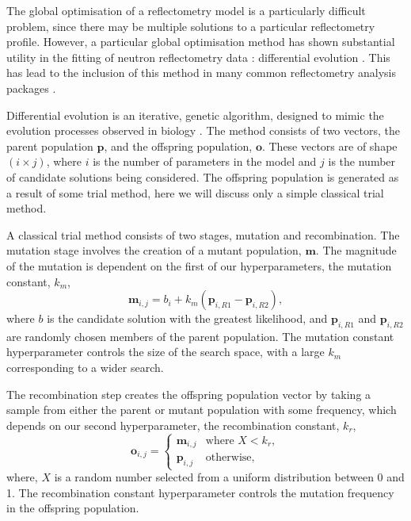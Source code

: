 \documentclass[
 reprint,
 superscriptaddress,
 amsmath,amssymb,
 aps,
]{revtex4-1}
\begin{document}
The global optimisation of a reflectometry model is a particularly difficult problem, since there may be multiple solutions to a particular reflectometry profile.
However, a particular global optimisation method has shown substantial utility in the fitting of neutron reflectometry data \cite{varderlee_comparison_2007}: differential evolution \cite{StornPrice_1997_DE,wormington_characterization_1999}.
This has lead to the inclusion of this method in many common reflectometry analysis packages \cite{bjorck_fitting_2011,nelson_refnx_2019,kienzle_ncnr_nodate}.

Differential evolution is an iterative, genetic algorithm, designed to mimic the evolution processes observed in biology \cite{holland_adaptation_1992}.
The method consists of two vectors, the parent population $\mathbf{p}$, and the offspring population, $\mathbf{o}$.
These vectors are of shape $(i \times j)$, where $i$ is the number of parameters in the model and $j$ is the number of candidate solutions being considered.
The offspring population is generated as a result of some trial method, here we will discuss only a simple classical trial method.

A classical trial method consists of two stages, mutation and recombination.
The mutation stage involves the creation of a mutant population, $\mathbf{m}$.
The magnitude of the mutation is dependent on the first of our hyperparameters, the mutation constant, $k_m$,
%
\begin{equation}
    \mathbf{m}_{i,j} = b_i + k_m (\mathbf{p}_{i, R1} - \mathbf{p}_{i, R2}),
\end{equation}
%
where $b$ is the candidate solution with the greatest likelihood, and $\mathbf{p}_{i, R1}$ and $\mathbf{p}_{i, R2}$ are randomly chosen members of the parent population.
The mutation constant hyperparameter controls the size of the search space, with a large $k_m$ corresponding to a wider search.

The recombination step creates the offspring population vector by taking a sample from either the parent or mutant population with some frequency, which depends on our second hyperparameter, the recombination constant, $k_r$,
%
\begin{equation}
    \mathbf{o}_{i, j} =
    \begin{cases}
        \mathbf{m}_{i, j} & \text{where } X < k_r,\\
        \mathbf{p}_{i, j} & \text{otherwise},
    \end{cases}
\end{equation}
%
where, $X$ is a random number selected from a uniform distribution between 0 and 1.
The recombination constant hyperparameter controls the mutation frequency in the offspring population.
\end{document}
